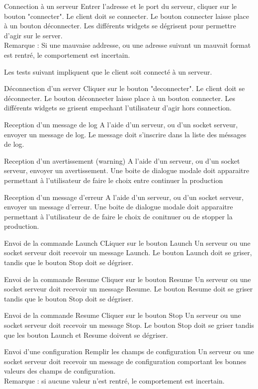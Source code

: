     {Connection à un serveur}
    {Entrer l'adresse et le port du serveur, cliquer sur le bouton "connecter".}
    {Le client doit se connecter.
    Le bouton connecter laisse place à un bouton déconnecter.
    Les différents widgets se dégrisent pour permettre d'agir sur le server.\\
    Remarque : Si une mauvaise addresse, ou une adresse suivant un mauvait format est rentré, le comportement est incertain.}

Les tests suivant impliquent que le client soit connecté à un serveur.

    {Déconnection d'un server}
    {Cliquer sur le bouton "deconnecter".}
    {Le client doit se déconnecter.
    Le bouton déconnecter laisse place à un bouton connecter.
    Les différents widgets se grisent empechant l'utilisateur d'agir hors connection.}

{Reception d'un message de log}
    {A l'aide d'un serveur, ou d'un socket serveur, envoyer un message de log.}
    {Le message doit s'inscrire dans la liste des méssages de log.}

{Reception d'un avertissement (warning)}
    {A l'aide d'un serveur, ou d'un socket serveur, envoyer un avertissement.}
    {Une boite de dialogue modale doit apparaitre permettant à l'utilisateur de faire le choix entre continuer la production}

{Reception d'un message d'erreur}
	{A l'aide d'un serveur, ou d'un socket serveur, envoyer un message d'erreur.}
	{Une boite de dialogue modale doit apparaitre permettant à l'utilisateur de de faire le choix de conitnuer ou de stopper la production.}

{Envoi de la commande Launch}
	{CLiquer sur le bouton Launch}
	{Un serveur ou une socket serveur doit recevoir un message Launch.
    Le bouton Launch doit se griser, tandis que le bouton Stop doit se dégriser.}

{Envoi de la commande Resume}
	{Cliquer sur le bouton Resume}
	{Un serveur ou une socket serveur doit recevoir un message Resume.
    Le bouton Resume doit se griser tandis que le bouton Stop doit se dégriser.}

{Envoi de la commande Resume}
	{Cliquer sur le bouton Stop}
	{Un serveur ou une socket serveur doit recevoir un message Stop.
    Le bouton Stop doit se griser tandis que les bouton Launch et Resume doivent se dégriser.}

{Envoi d'une configuration}
	{Remplir les champs de configuration}
	{Un serveur ou une socket serveur doit recevoir un message de configuration comportant les bonnes valeurs des champs de configuration.\\Remarque : si aucune valeur n'est rentré, le comportement est incertain.}

    

